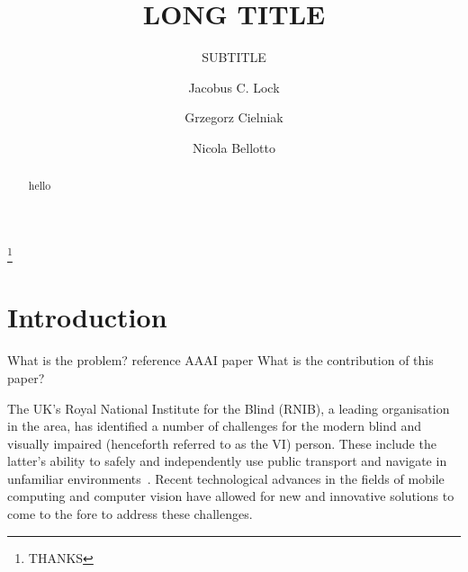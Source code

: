 \documentclass[format=sigconf, review=true, screen=true, anonymous=true]{acmart}
\begin{document}

\title[SHORT TITLE]{LONG TITLE}
\subtitle{SUBTITLE}

\author{Jacobus C. Lock}

\author{Grzegorz Cielniak}

\author{Nicola Bellotto}

\thanks{THANKS}



\maketitle

\begin{abstract}
  hello
\end{abstract}

\section{Introduction}

What is the problem? reference AAAI paper
What is the contribution of this paper?

The UK's Royal National Institute for the Blind (RNIB), a leading organisation in the area, has identified a number of challenges for the modern blind and visually impaired (henceforth referred to as the VI) person. These include the latter's ability to safely and independently use public transport and navigate in unfamiliar environments~\cite{rnib-objectives}. Recent technological advances in the fields of mobile computing and computer vision have allowed for new and innovative solutions to come to the fore to address these challenges. 
\end{document}
